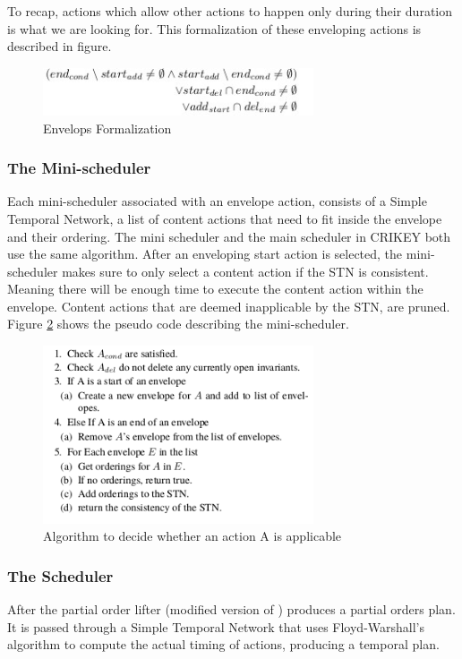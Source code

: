 \documentclass
[a4paper
,english
,parskip=half
,bibliography=totoc
]{scrreprt}
\begin{document}
          To recap, actions which allow other actions to happen only during their duration is what we are looking for. This formalization of these enveloping actions is described in figure.
          \begin{figure}[h]
            \centering    
            \includegraphics[width=8cm]{envelops.jpg}
            \caption{Envelops Formalization}
             \label{fig:envelops}
        \end{figure}


        \subsubsection{The Mini-scheduler}
        Each mini-scheduler associated with an envelope action, consists of a Simple Temporal Network, a list of content actions that need to fit inside the envelope and their ordering. The mini scheduler and the main scheduler in CRIKEY both use the same algorithm. After an enveloping start action is selected, the mini-scheduler makes sure to only select a content action if the STN is consistent. Meaning there will be enough time to execute the content action within the envelope. Content actions that are deemed inapplicable by the STN, are pruned. Figure \ref{fig:algorithm} shows the pseudo code describing the mini-scheduler.
        \begin{figure}[h]
            \centering    
            \includegraphics[width=8cm]{sched_algorithm.png}
            \caption{Algorithm to decide whether an action A is applicable}
             \label{fig:algorithm}
        \end{figure}

        \subsubsection{The Scheduler}
        After the partial order lifter (modified version of \citep{rintegrating})  produces a partial orders plan. It is passed through a Simple Temporal Network that uses Floyd-Warshall's algorithm to compute the actual timing of actions, producing a temporal plan.
\end{document}
